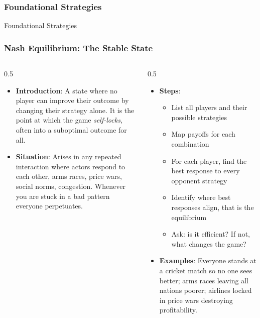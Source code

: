 \begin{frame}[fragile]\frametitle{Foundational Strategies}
\begin{center}
{\Large Foundational Strategies}
\end{center}
\end{frame}

\begin{frame}[fragile]\frametitle{Nash Equilibrium: The Stable State}
\begin{columns}
    \begin{column}[T]{0.5\linewidth}
      \begin{itemize}
        \item \textbf{Introduction}: A state where no player can improve their outcome by changing their strategy alone. It is the point at which the game \textit{self-locks}, often into a suboptimal outcome for all.
        \item \textbf{Situation}: Arises in any repeated interaction where actors respond to each other, arms races, price wars, social norms, congestion. Whenever you are stuck in a bad pattern everyone perpetuates.
      \end{itemize}
    \end{column}
    \begin{column}[T]{0.5\linewidth}
      \begin{itemize}
        \item \textbf{Steps}:
        \begin{itemize}
          \item List all players and their possible strategies
          \item Map payoffs for each combination
          \item For each player, find the best response to every opponent strategy
          \item Identify where best responses align, that is the equilibrium
          \item Ask: is it efficient? If not, what changes the game?
        \end{itemize}\item \textbf{Examples}: Everyone stands at a cricket match so no one sees better; arms races leaving all nations poorer; airlines locked in price wars destroying profitability.
      \end{itemize}
    \end{column}
  \end{columns}
\end{frame}

